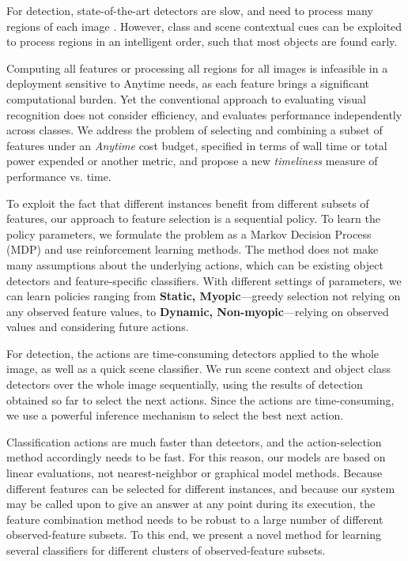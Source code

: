For detection, state-of-the-art detectors are slow, and need to process many regions of each image \cite{Felzenszwalb2010a,Girshick-CVPR-2014}.
However, class and scene contextual cues can be exploited to process regions in an intelligent order, such that most objects are found early.

Computing all features or processing all regions for all images is infeasible in a deployment sensitive to Anytime needs, as each feature brings a significant computational burden.
Yet the conventional approach to evaluating visual recognition does not consider efficiency, and evaluates performance independently across classes.
We address the problem of selecting and combining a subset of features under an \emph{Anytime} cost budget, specified in terms of wall time or total power expended or another metric, and propose a new \emph{timeliness} measure of performance vs. time.

To exploit the fact that different instances benefit from different subsets of features, our approach to feature selection is a sequential policy.
To learn the policy parameters, we formulate the problem as a Markov Decision Process (MDP) and use reinforcement learning methods.
The method does not make many assumptions about the underlying actions, which can be existing object detectors and feature-specific classifiers.
With different settings of parameters, we can learn policies ranging from \textbf{Static, Myopic}---greedy selection not relying on any observed feature values, to \textbf{Dynamic, Non-myopic}---relying on observed values and considering future actions.

For detection, the actions are time-consuming detectors applied to the whole image, as well as a quick scene classifier.
We run scene context and object class detectors over the whole image sequentially, using the results of detection obtained so far to select the next actions.
Since the actions are time-consuming, we use a powerful inference mechanism to select the best next action.

Classification actions are much faster than detectors, and the action-selection method accordingly needs to be fast.
For this reason, our models are based on linear evaluations, not nearest-neighbor or graphical model methods.
Because different features can be selected for different instances, and because our system may be called upon to give an answer at any point during its execution, the feature combination method needs to be robust to a large number of different observed-feature subsets.
To this end, we present a novel method for learning several classifiers for different clusters of observed-feature subsets.

